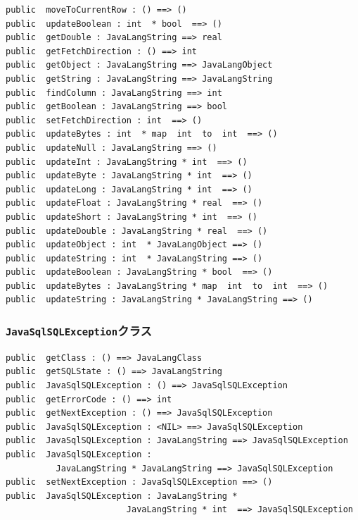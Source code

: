 \documentclass[\pformat,12pt]{jarticle}
\begin{document}
\begin{small}
\begin{verbatim}
public  moveToCurrentRow : () ==> ()
public  updateBoolean : int  * bool  ==> ()
public  getDouble : JavaLangString ==> real
public  getFetchDirection : () ==> int
public  getObject : JavaLangString ==> JavaLangObject
public  getString : JavaLangString ==> JavaLangString
public  findColumn : JavaLangString ==> int
public  getBoolean : JavaLangString ==> bool
public  setFetchDirection : int  ==> ()
public  updateBytes : int  * map  int  to  int  ==> ()
public  updateNull : JavaLangString ==> ()
public  updateInt : JavaLangString * int  ==> ()
public  updateByte : JavaLangString * int  ==> ()
public  updateLong : JavaLangString * int  ==> ()
public  updateFloat : JavaLangString * real  ==> ()
public  updateShort : JavaLangString * int  ==> ()
public  updateDouble : JavaLangString * real  ==> ()
public  updateObject : int  * JavaLangObject ==> ()
public  updateString : int  * JavaLangString ==> ()
public  updateBoolean : JavaLangString * bool  ==> ()
public  updateBytes : JavaLangString * map  int  to  int  ==> ()
public  updateString : JavaLangString * JavaLangString ==> ()
\end{verbatim}
\end{small}

\subsubsection{\texttt{JavaSqlSQLException}クラス}
\begin{small}
\begin{verbatim}
public  getClass : () ==> JavaLangClass
public  getSQLState : () ==> JavaLangString
public  JavaSqlSQLException : () ==> JavaSqlSQLException
public  getErrorCode : () ==> int
public  getNextException : () ==> JavaSqlSQLException
public  JavaSqlSQLException : <NIL> ==> JavaSqlSQLException
public  JavaSqlSQLException : JavaLangString ==> JavaSqlSQLException
public  JavaSqlSQLException : 
          JavaLangString * JavaLangString ==> JavaSqlSQLException
public  setNextException : JavaSqlSQLException ==> ()
public  JavaSqlSQLException : JavaLangString * 
                        JavaLangString * int  ==> JavaSqlSQLException
\end{verbatim}
\end{small}
\end{document}
